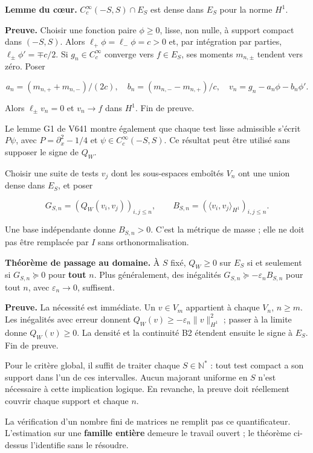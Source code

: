 \documentclass[
  10pt,
  a4paper,
]{article}
\begin{document}
\textbf{Lemme du cœur.} \(C_c^\infty(-S,S)\cap E_S\) est dense dans
\(E_S\) pour la norme \(H^1\).

\textbf{Preuve.} Choisir une fonction paire \(\phi\ge0\), lisse, non
nulle, à support compact dans \((-S,S)\). Alors
\(\ell_+\phi=\ell_-\phi=c>0\) et, par intégration par parties,
\(\ell_\pm\phi'=\mp c/2\). Si \(g_n\in C_c^\infty\) converge vers
\(f\in E_S\), ses moments \(m_{n,\pm}\) tendent vers zéro. Poser

\[
a_n=(m_{n,+}+m_{n,-})/(2c),\quad
b_n=(m_{n,-}-m_{n,+})/c,
\quad v_n=g_n-a_n\phi-b_n\phi'.
\]

Alors \(\ell_\pm v_n=0\) et \(v_n\to f\) dans \(H^1\). Fin de preuve.

Le lemme G1 de V641 montre également que chaque test lisse admissible
s'écrit \(P\psi\), avec \(P=\partial_x^2-1/4\) et
\(\psi\in C_c^\infty(-S,S)\). Ce résultat peut être utilisé sans
supposer le signe de \(Q_W\).

Choisir une suite de tests \(v_j\) dont les sous-espaces emboîtés
\(V_n\) ont une union dense dans \(E_S\), et poser

\[
G_{S,n}=(Q_W(v_i,v_j))_{i,j\le n},\qquad
B_{S,n}=(\langle v_i,v_j\rangle_{H^1})_{i,j\le n}.
\]

Une base indépendante donne \(B_{S,n}>0\). C'est la métrique de masse ;
elle ne doit pas être remplacée par \(I\) sans orthonormalisation.

\textbf{Théorème de passage au domaine.} À \(S\) fixé, \(Q_W\ge0\) sur
\(E_S\) si et seulement si \(G_{S,n}\succeq0\) pour \textbf{tout} \(n\).
Plus généralement, des inégalités
\(G_{S,n}\succeq-\varepsilon_n B_{S,n}\) pour tout \(n\), avec
\(\varepsilon_n\to0\), suffisent.

\textbf{Preuve.} La nécessité est immédiate. Un \(v\in V_m\) appartient
à chaque \(V_n\), \(n\ge m\). Les inégalités avec erreur donnent
\(Q_W(v)\ge-\varepsilon_n\|v\|_{H^1}^2\) ; passer à la limite donne
\(Q_W(v)\ge0\). La densité et la continuité B2 étendent ensuite le signe
à \(E_S\). Fin de preuve.

Pour le critère global, il suffit de traiter chaque \(S\in\mathbb N^*\)
: tout test compact a son support dans l'un de ces intervalles. Aucun
majorant uniforme en \(S\) n'est nécessaire à cette implication logique.
En revanche, la preuve doit réellement couvrir chaque support et chaque
\(n\).

La vérification d'un nombre fini de matrices ne remplit pas ce
quantificateur. L'estimation sur une \textbf{famille entière} demeure le
travail ouvert ; le théorème ci-dessus l'identifie sans le résoudre.
\end{document}

